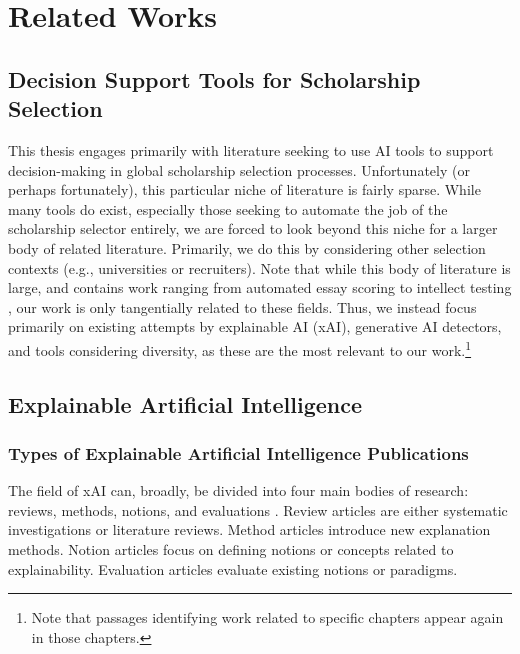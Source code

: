 


\chapter{\label{ch:rw}Related Works} 
\minitoc

\section{Decision Support Tools for Scholarship Selection}
This thesis engages primarily with literature seeking to use AI tools to support decision-making in global scholarship selection processes. Unfortunately (or perhaps fortunately), this particular niche of literature is fairly sparse. While many tools do exist, especially those seeking to automate the job of the scholarship selector entirely, we are forced to look beyond this niche for a larger body of related literature. Primarily, we do this by considering other selection contexts (e.g., universities or recruiters). Note that while this body of literature is large, and contains work ranging from automated essay scoring to intellect testing \cite{cozma_automated_2018,condon2014international}, our work is only tangentially related to these fields. Thus, we instead focus primarily on existing attempts by explainable AI (xAI), generative AI detectors, and tools considering diversity, as these are the most relevant to our work.\footnote{Note that passages identifying work related to specific chapters appear again in those chapters.}

\section{Explainable Artificial Intelligence}
\subsection{Types of Explainable Artificial Intelligence Publications}
The field of xAI can, broadly, be divided into four main bodies of research: reviews, methods, notions, and evaluations \cite{vilone_explainable_2020}. Review articles are either systematic investigations or literature reviews. Method articles introduce new explanation methods. Notion articles focus on defining notions or concepts related to explainability. Evaluation articles evaluate existing notions or paradigms.

